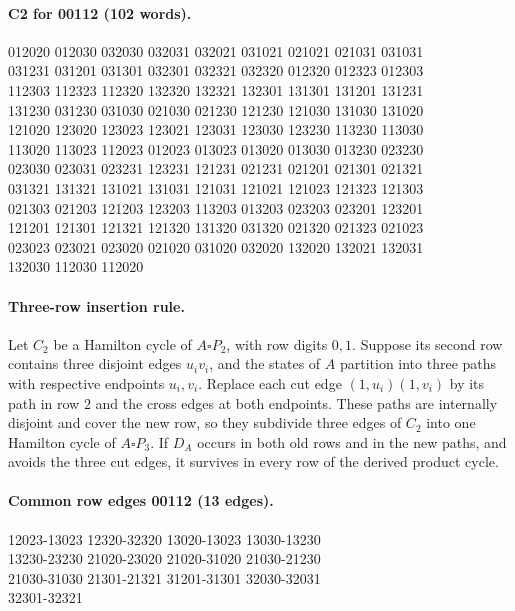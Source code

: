 \paragraph{C2 for 00112 (102 words).}
\begingroup\small\ttfamily\begin{flushleft}
012020 012030 032030 032031 032021 031021 021021 021031 031031\\
031231 031201 031301 032301 032321 032320 012320 012323 012303\\
112303 112323 112320 132320 132321 132301 131301 131201 131231\\
131230 031230 031030 021030 021230 121230 121030 131030 131020\\
121020 123020 123023 123021 123031 123030 123230 113230 113030\\
113020 113023 112023 012023 013023 013020 013030 013230 023230\\
023030 023031 023231 123231 121231 021231 021201 021301 021321\\
031321 131321 131021 131031 121031 121021 121023 121323 121303\\
021303 021203 121203 123203 113203 013203 023203 023201 123201\\
121201 121301 121321 121320 131320 031320 021320 021323 021023\\
023023 023021 023020 021020 031020 032020 132020 132021 132031\\
132030 112030 112020\\
\end{flushleft}\endgroup
\paragraph{Three-row insertion rule.}
Let $C_2$ be a Hamilton cycle of $A\square P_2$, with row digits
$0,1$. Suppose its
second row contains three disjoint edges $u_i v_i$, and the states
of $A$ partition into three paths with respective endpoints $u_i,v_i$.
Replace each cut edge $(1,u_i)(1,v_i)$ by its path in row $2$ and
the cross edges at both endpoints. These paths are internally
disjoint and cover the new row, so they subdivide three edges of
$C_2$ into one Hamilton cycle of $A\square P_3$.
If $D_A$ occurs in both old rows and in the new paths, and avoids
the three cut edges, it survives in every row of the derived product cycle.

\paragraph{Common row edges 00112 (13 edges).}
\begingroup\small\ttfamily\begin{flushleft}
12023-13023 12320-32320 13020-13023 13030-13230\\
13230-23230 21020-23020 21020-31020 21030-21230\\
21030-31030 21301-21321 31201-31301 32030-32031\\
32301-32321\\
\end{flushleft}\endgroup
